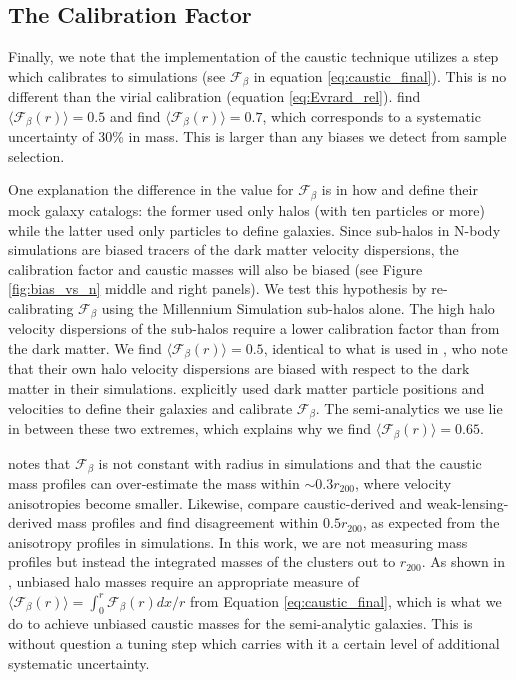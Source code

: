 \documentclass[iop]{emulateapj}
\begin{document}
\subsection{The Calibration Factor}
Finally, we note that the implementation of the caustic technique utilizes a step which calibrates to simulations (see $\mathcal{F}_{\beta}$ in equation \ref{eq:caustic_final}). This is no different than the virial calibration (equation \ref{eq:Evrard_rel}). \citet{Diaferio99} find $\langle \mathcal{F}_{\beta}(r) \rangle = 0.5$ and \citet{Serra11} find $\langle \mathcal{F}_{\beta}(r) \rangle = 0.7$, which corresponds to a systematic uncertainty of 30\% in mass. This is larger than any biases we detect from sample selection.

One explanation the difference in the value for $\mathcal{F}_{\beta}$ is in how \citet{Diaferio99} and  \citet{Serra11} define their mock galaxy catalogs: the former used only halos (with ten particles or more) while the latter used only particles to define galaxies. Since sub-halos in N-body simulations are biased tracers of the dark matter velocity dispersions, the calibration factor and caustic masses will also be biased (see Figure \ref{fig:bias_vs_n} middle and right panels). We test this hypothesis by re-calibrating  $\mathcal{F}_{\beta}$ using the Millennium Simulation sub-halos alone. The high halo velocity dispersions of the sub-halos require a lower calibration factor than from the dark matter. We find $\langle \mathcal{F}_{\beta}(r) \rangle = 0.5$, identical to what is used in  \citet{Diaferio99}, who note that their own halo velocity dispersions are biased with respect to the dark matter in their simulations. \citet{Serra11} explicitly used dark matter particle positions and velocities to define their galaxies and calibrate $\mathcal{F}_{\beta}$. The semi-analytics we use lie in between these two extremes, which explains why we find $\langle \mathcal{F}_{\beta}(r) \rangle = 0.65$. 

\citet{Serra11} notes that  $\mathcal{F}_{\beta}$ is not constant with radius in simulations and that the caustic mass profiles can over-estimate the mass within $\sim 0.3r_{200}$, where velocity anisotropies become smaller. Likewise, \citet{Geller13} compare caustic-derived and weak-lensing-derived mass profiles and find disagreement within $0.5r_{200}$, as expected from the anisotropy profiles in simulations. In this work, we are not measuring mass profiles but instead the integrated masses of the clusters out to $r_{200}$. As shown in \citet{Serra11}, unbiased halo masses require an appropriate measure of $\langle \mathcal{F}_{\beta}(r) \rangle = \int_{0}^{r} \mathcal{F}_{\beta}(r) dx/r$ from Equation \ref{eq:caustic_final}, which is what we do to achieve unbiased caustic masses for the \citet{Guo11} semi-analytic galaxies. This is without question a tuning step which carries with it a certain level of additional systematic uncertainty.
\end{document}
